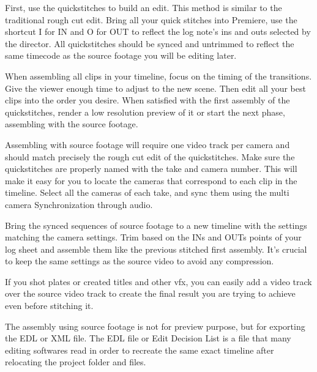 \begin{fullwidth}
First, use the quickstitches to build an edit. This method is similar to the traditional rough cut edit. Bring all your quick stitches into Premiere, use the shortcut I for IN and O for OUT to reflect the log note’s ins and outs selected by the director. All quickstitches should be synced and untrimmed to reflect the same timecode as the source footage you will be editing later.

When assembling all clips in your timeline, focus on the timing of the transitions. Give the viewer enough time to adjust to the new scene. Then edit all your best clips into the order you desire. 
When satisfied with the first assembly of the quickstitches, render a low resolution preview of it or start the next phase, assembling with the source footage.

Assembling with source footage will require one video track per camera and should match precisely the rough cut edit of the quickstitches. Make sure the quickstitches are properly named with the take and camera number. This will make it easy for you to locate the cameras that correspond to each clip in the timeline. Select all the cameras of each take, and sync them using the multi camera Synchronization through audio.

Bring the synced sequences of source footage to a new timeline with the settings matching the camera settings. Trim based on the INs and OUTs points of your log sheet and assemble them like the previous stitched first assembly. It’s crucial to keep the same settings as the source video to avoid any compression. 

If you shot plates or created titles and other vfx, you can easily add a video track over the source video track to create the final result you are trying to achieve even before stitching it.

The assembly using source footage is not for preview purpose, but for exporting the EDL or XML file. The EDL file or Edit Decision List is a file that many editing softwares read in order to recreate the same exact timeline after relocating the project folder and files.



\clearpage
\end{fullwidth}